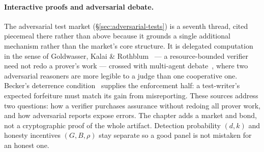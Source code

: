 \documentclass[11pt,a4paper]{article}
\theoremstyle{definition}
\theoremstyle{definition}
\theoremstyle{remark}
\begin{document}
\paragraph{Interactive proofs and adversarial debate.} The adversarial test market
(\S\ref{sec:adversarial-tests}) is a seventh thread, cited piecemeal there rather
than above because it grounds a single additional mechanism rather than the market's
core structure. It is delegated computation in the sense of Goldwasser, Kalai \&
Rothblum~ --- a resource-bounded verifier need not redo a
prover's work --- crossed with multi-agent debate~, where two
adversarial reasoners are more legible to a judge than one cooperative one. Becker's
deterrence condition~ supplies the enforcement half: a test-writer's
expected forfeiture must match its gain from misreporting.
These sources address two questions: how a verifier purchases assurance without
redoing all prover work, and how adversarial reports expose errors. The chapter
adds a market and bond, not a cryptographic proof of the whole artifact.
Detection probability $(d,k)$ and honesty incentives $(G,B,\rho)$ stay separate
so a good panel is not mistaken for an honest one.
\end{document}
